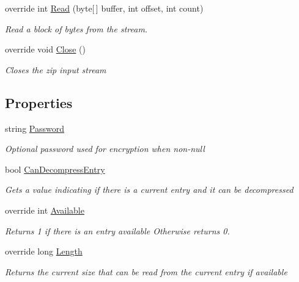 \begin{DoxyCompactItemize}
override int \hyperlink{class_i_c_sharp_code_1_1_sharp_zip_lib_1_1_zip_1_1_zip_input_stream_aa0888d2168f1f365c4b5d89a6ad55ba9}{Read} (byte\mbox{[}$\,$\mbox{]} buffer, int offset, int count)
\begin{DoxyCompactList}\small\item\em Read a block of bytes from the stream. \end{DoxyCompactList}\item 
override void \hyperlink{class_i_c_sharp_code_1_1_sharp_zip_lib_1_1_zip_1_1_zip_input_stream_a726748563aeb79d22f65546352bec318}{Close} ()
\begin{DoxyCompactList}\small\item\em Closes the zip input stream \end{DoxyCompactList}\end{DoxyCompactItemize}
\subsection*{Properties}
\begin{DoxyCompactItemize}
\item 
string \hyperlink{class_i_c_sharp_code_1_1_sharp_zip_lib_1_1_zip_1_1_zip_input_stream_a49de355342270384674e6dbeabd12499}{Password}
\begin{DoxyCompactList}\small\item\em Optional password used for encryption when non-\/null \end{DoxyCompactList}\item 
bool \hyperlink{class_i_c_sharp_code_1_1_sharp_zip_lib_1_1_zip_1_1_zip_input_stream_a9e0fd72568e6716431d93ba09dc205b9}{Can\+Decompress\+Entry}
\begin{DoxyCompactList}\small\item\em Gets a value indicating if there is a current entry and it can be decompressed \end{DoxyCompactList}\item 
override int \hyperlink{class_i_c_sharp_code_1_1_sharp_zip_lib_1_1_zip_1_1_zip_input_stream_aac8a4aae90c30d46be0e570a23ade71c}{Available}
\begin{DoxyCompactList}\small\item\em Returns 1 if there is an entry available Otherwise returns 0. \end{DoxyCompactList}\item 
override long \hyperlink{class_i_c_sharp_code_1_1_sharp_zip_lib_1_1_zip_1_1_zip_input_stream_aabfedc685a5bf73b77bff811dfc57d40}{Length}
\begin{DoxyCompactList}\small\item\em Returns the current size that can be read from the current entry if available \end{DoxyCompactList}\end{DoxyCompactItemize}
